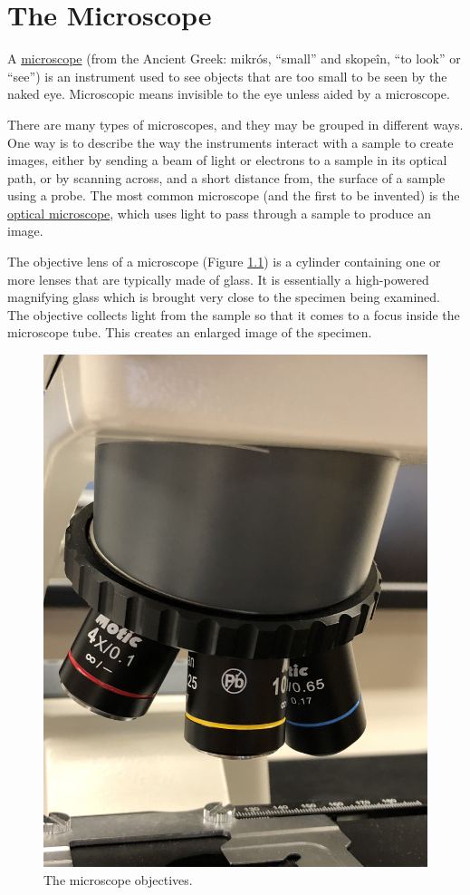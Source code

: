 \chapter{The Microscope}\label{the-microscope}

A \href{https://en.wikipedia.org/wiki/Microscope}{microscope} (from the Ancient Greek: mikrós, ``small'' and skopeîn, ``to look'' or ``see'') is an instrument used to see objects that are too small to be seen by the naked eye. Microscopic means invisible to the eye unless aided by a microscope.

There are many types of microscopes, and they may be grouped in different ways. One way is to describe the way the instruments interact with a sample to create images, either by sending a beam of light or electrons to a sample in its optical path, or by scanning across, and a short distance from, the surface of a sample using a probe. The most common microscope (and the first to be invented) is the \href{https://en.wikipedia.org/wiki/Optical_microscope}{optical microscope}, which uses light to pass through a sample to produce an image.

The objective lens of a microscope (Figure \ref{fig:objectives}) is a cylinder containing one or more lenses that are typically made of glass. It is essentially a high-powered magnifying glass which is brought very close to the specimen being examined. The objective collects light from the sample so that it comes to a focus inside the microscope tube. This creates an enlarged image of the specimen.

\begin{figure}

{\centering \includegraphics[width=0.7\linewidth]{./figures/microscope/Microscope_objectives} 

}

\caption{The microscope objectives.}\label{fig:objectives}
\end{figure}

